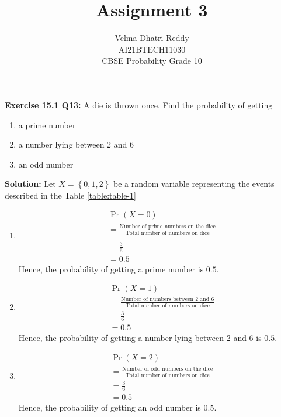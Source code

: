 \documentclass[journal,11pt,twocolumn]{IEEEtran}
\title{Assignment 3}
\author{Velma Dhatri Reddy \\ \normalsize AI21BTECH11030 \\ \vspace*{10pt} \Large CBSE Probability Grade 10}
\providecommand{\pr}[1]{\ensuremath{\Pr\left(#1\right)}}
\providecommand{\cbrak}[1]{\ensuremath{\left\{#1\right\}}}
\begin{document}
\maketitle
\textbf{Exercise 15.1 Q13:}
A die is thrown once. Find the probability of getting	\begin{enumerate}[label=(\roman*)]
		\item a prime number
		\item a number lying between 2 and 6
		\item an odd number
\end{enumerate}

\textbf{Solution:} Let $X=\cbrak{0,1,2}$ be a random variable representing the events described in the Table	\eqref{table:table-1}

\begin{table}[ht!]
	
	\vspace*{5pt}
\caption{}
	\label{table:table-1}
\end{table}
\begin{enumerate}[label=(\roman*)]
	\item
\begin{align}
    &\pr{X=0} \\
    &= \frac{\text{Number of prime numbers on the dice}}{\text{Total number of numbers on dice}}\\ \\
    &=\frac{3}{6}\\
    &=0.5
\end{align}
Hence, the probability of getting a prime number is $0.5$.
	\item 
\begin{align}
    &\pr{X=1} \\
    &= \frac{\text{Number of numbers between 2 and 6}}{\text{Total number of numbers on dice}}\\
 	&=\frac{3}{6}\\
	&=0.5
\end{align}
Hence, the probability of getting a number lying between 2 and 6 is $0.5$.
	\item 
\begin{align}
    &\pr{X=2} \\
    &= \frac{\text{Number of odd numbers on the dice}}{\text{Total number of numbers on dice}}\\
	&=\frac{3}{6}\\
    &=0.5
\end{align}
Hence, the probability of getting an odd number is $0.5$.
\end{enumerate}
\end{document}
